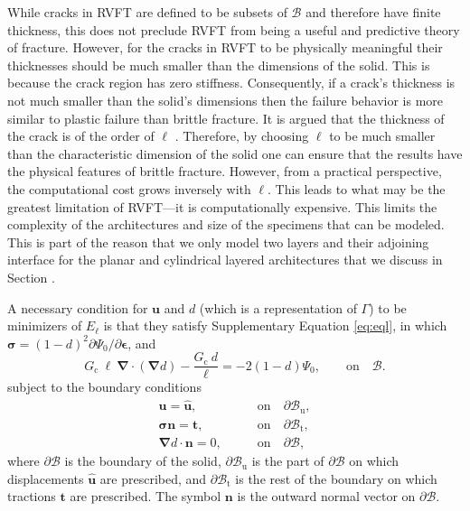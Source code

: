 \documentclass[12pt,onecolumn]{article}
\makeatletter
\DeclareRobustCommand*{\nameref}[1]{%
      \emph{\myorg@nameref{#1}}%
    }%
\newcommand{\bs}[1]{\ensuremath{\mathbf{#1}}}
\makeatother
\begin{document}
\begin{bibunit}
While cracks in RVFT are defined to be subsets of $\mathcal{B}$ and therefore have finite thickness, this does not preclude RVFT from being a useful and predictive theory of fracture. However, for the cracks in RVFT to be physically meaningful their thicknesses should be much smaller than the dimensions of the solid. This is because the crack region has zero stiffness. Consequently, if a crack’s thickness is not much smaller than the solid’s dimensions then the failure behavior is more similar to plastic failure than brittle fracture. It is argued that the thickness of the crack is of the order of $\ell$ \cite{amiri2014phase}. Therefore, by choosing $\ell$ to be much smaller than the characteristic dimension of the solid one can ensure that the results have the physical features of brittle fracture. However, from a practical perspective, the computational cost grows inversely with $\ell$. This leads to what may be the greatest limitation of RVFT---it is computationally expensive. This limits the complexity of the architectures and size of the specimens that can be modeled. This is part of the reason that we only model two layers and their adjoining interface for the planar and cylindrical layered architectures that we discuss in Section \nameref{sec:discussion}. 
 
A necessary condition for $\bs{u}$ and $d$ (which is a representation of $\Gamma$) to be  minimizers of $E_{\ell}$ is that they satisfy Supplementary Equation \eqref{eq:eql}, in which  $\bm{\sigma}=(1-d)^2\partial\Psi_0/\partial \bm{\epsilon}$, and 
%
\begin{equation}
	G_\mathrm{c} ~\ell~ \bm{\nabla} \cdot \left(\bm{\nabla} d\right) -  \frac{G_\mathrm{c}~ d}{\ell} = -2(1-d) \Psi_0,  \qquad \text{on} \quad \mathcal{B}. \label{damage_pde}
\end{equation} 
%
subject to the boundary conditions
%
\begin{subequations}\label{Bcs}
	\begin{align}
	\bs{u} = \hat{\bs{u}}, \qquad &\text{on} \quad \partial\mathcal{B}_\mathrm{u},\\
	\bm{\sigma} \bs{n} = \bs{t}, \qquad &\text{on} \quad \partial\mathcal{B}_\mathrm{t},\\
	\bm{\nabla} d \cdot \bs{n} = 0, \qquad &\text{on} \quad \partial\mathcal{B},
	\end{align}
\end{subequations}
%
where $\partial\mathcal{B}$ is the boundary of the solid, $\partial\mathcal{B}_\mathrm{u}$ is the part of $\partial\mathcal{B}$ on which displacements $\hat{\bs{u}}$ are prescribed, and $\partial\mathcal{B}_\mathrm{t}$ is the rest of the boundary on which tractions $\bs{t}$ are prescribed. The symbol $\bs{n}$ is the outward normal vector on $\partial\mathcal{B}$. 


\end{bibunit}
\end{document}
